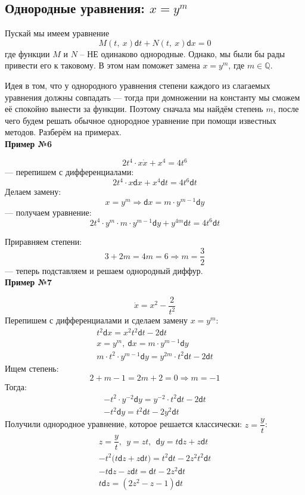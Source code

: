 \documentclass[a4paper,12pt]{article}
\newcommand{\Q}{\mathbb{Q}}
\renewcommand{\d}{\mathsf{d}}
\newcommand{\dx}{\dot{x}}
\begin{document}
\subsection{Однородные уравнения: $x = y^m$}

Пускай мы имеем уравнение
\[M(t,\ x) \d t + N(t,\ x)\d x = 0\] где функции $M$ и $N$ -- НЕ одинаково однородные. Однако, мы были бы рады привести его к таковому. В этом нам поможет замена $x = y^m$, где $m \in \Q$. 

Идея в том, что у однородного уравнения степени каждого из слагаемых уравнения должны совпадать --- тогда при домножении на константу мы сможем её спокойно вынести за функции. Поэтому сначала мы найдём степень $m$, после чего будем решать обычное однородное уравнение при помощи известных методов. Разберём на примерах.
\ \\

\textbf{Пример №6}

\[2t^4\cdot x\dx + x^4 = 4t^6\] --- перепишем с дифференциалами:
\[2t^4 \cdot x\d x + x^4\d t= 4t^6\d t\]
Делаем замену:
\[x = y^m \Longrightarrow \d x = m \cdot y^{m - 1}\d y\] --- получаем уравнение:
\[2t^4 \cdot y^m \cdot m \cdot y^{m - 1}\d y + y^{4m}\d t = 4t^6\d t\]

Приравняем степени:
\[3 + 2m = 4m = 6 \Longrightarrow m = \dfrac{3}{2}\] --- теперь подставляем и решаем однородный диффур.
\ \\

\textbf{Пример №7}

\[\dx = x^2 - \dfrac{2}{t^2}\]
Перепишем с дифференциалами и сделаем замену $x = y^m$:
\begin{gather*}
	t^2\d x = x^2t^2\d t - 2\d t\\
	x = y^m,\ \d x =  m \cdot y^{m - 1}\d y\\
	m\cdot t^2 \cdot y^{m - 1}\d y = y^{2m}\cdot t^2\d t - 2\d t
\end{gather*}
Ищем степень:
\[2 + m - 1 = 2m + 2 = 0 \Longrightarrow m = -1\]
Тогда:
\begin{gather*}
	-t^2\cdot y^{-2}\d y = y^{-2} \cdot t^2\d t - 2\d t\\
	-t^2\d y = t^2\d t - 2y^2\d t
\end{gather*}
Получили однородное уравнение, которое решается классически: $z = \dfrac{y}{t}$:
\begin{gather*}
	z = \dfrac{y}{t},\ \ y = zt,\ \ \d y = t \d z + z\d t\\
	-t^2\big(t\d z + z\d t\big) = t^2\d t - 2z^2t^2\d t\\
	-t\d z - z \d t =  \d t - 2z^2\d t\\
	t\d z = (2z^2 - z - 1)\d t
\end{gather*}
\end{document}
